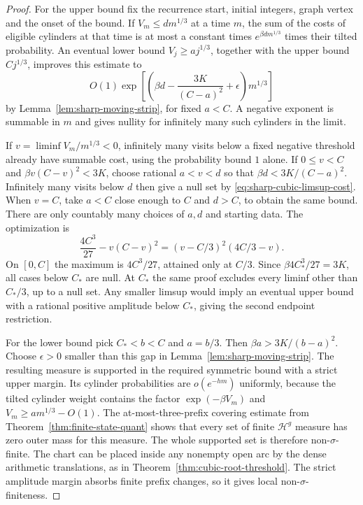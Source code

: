 \documentclass[11pt]{article}
\theoremstyle{definition}
\theoremstyle{remark}
\begin{document}
\begin{proof}
For the upper bound fix the recurrence start, initial integers,
graph vertex and the onset of the bound. If
$V_m\le d m^{1/3}$ at a time $m$, the sum of the costs of
eligible cylinders at that time is at most a constant times
$e^{\beta d m^{1/3}}$ times their tilted probability.
An eventual lower bound $V_j\ge a j^{1/3}$, together with
the upper bound $C j^{1/3}$, improves this estimate to
\begin{equation}
 O(1)\exp\left[
    \left(\beta d-\frac{3K}{(C-a)^2}+\epsilon\right)m^{1/3}
 \right]
 \label{eq:sharp-cubic-limsup-cost}
\end{equation}
by Lemma~\ref{lem:sharp-moving-strip}, for fixed $a<C$.
A negative exponent is summable in $m$ and gives nullity
for infinitely many such cylinders in the limit.

If $v=\liminf V_m/m^{1/3}<0$, infinitely many visits below
a fixed negative threshold already have summable cost,
using the probability bound $1$ alone.
If $0\le v<C$ and $\beta v(C-v)^2<3K$, choose rational
$a<v<d$ so that $\beta d<3K/(C-a)^2$. Infinitely many visits
below $d$ then give a null set by
\eqref{eq:sharp-cubic-limsup-cost}. When $v=C$, take $a<C$
close enough to $C$ and $d>C$, to obtain the same bound.
There are only countably many choices of $a,d$ and starting data.
The optimization is
\[
 \frac{4C^3}{27}-v(C-v)^2
    =(v-C/3)^2(4C/3-v) .
\]
On $[0,C]$ the maximum is $4C^3/27$, attained only at $C/3$.
Since $\beta 4C_*^3/27=3K$, all cases below $C_*$ are null.
At $C_*$ the same proof excludes every liminf other than $C_*/3$,
up to a null set. Any smaller limsup would imply an eventual
upper bound with a rational positive amplitude below $C_*$,
giving the second endpoint restriction.

For the lower bound pick $C_*<b<C$ and $a=b/3$. Then
$\beta a>3K/(b-a)^2$. Choose $\epsilon>0$ smaller than
this gap in Lemma~\ref{lem:sharp-moving-strip}.
The resulting measure is supported in the required symmetric
bound with a strict upper margin. Its cylinder probabilities
are $o(e^{-hm})$ uniformly, because the tilted cylinder
weight contains the factor $\exp(-\beta V_m)$ and
$V_m\ge a m^{1/3}-O(1)$.
The at-most-three-prefix covering estimate from
Theorem~\ref{thm:finite-state-quant} shows that every set of
finite $\mathcal H^g$ measure has zero outer mass for this
measure. The whole supported set is therefore
non-$\sigma$-finite. The chart can be placed inside any
nonempty open arc by the dense arithmetic translations,
as in Theorem~\ref{thm:cubic-root-threshold}.
The strict amplitude margin absorbs finite prefix changes,
so it gives local non-$\sigma$-finiteness.
\end{proof}
\end{document}
